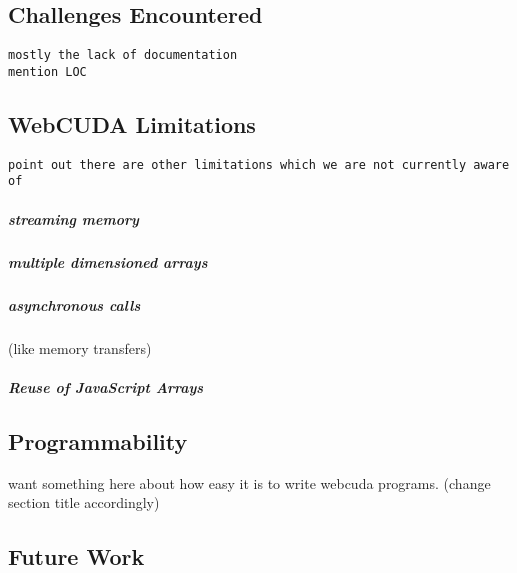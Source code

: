 
\subsection{Challenges Encountered}
\begin{verbatim}
mostly the lack of documentation
mention LOC
\end{verbatim}

\subsection{WebCUDA Limitations}
\begin{verbatim}
point out there are other limitations which we are not currently aware of 
\end{verbatim}
\subparagraph{streaming memory}
\subparagraph{multiple dimensioned arrays}
\subparagraph{asynchronous calls} (like memory transfers)
\subparagraph{Reuse of JavaScript Arrays}

\subsection{Programmability}
want something here about how easy it is to write webcuda programs. (change section title accordingly)

\subsection{Future Work}
